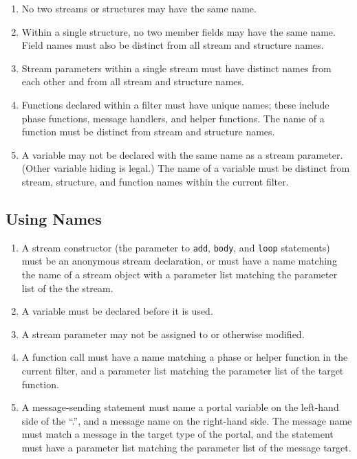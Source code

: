\documentclass[11pt]{article}
\begin{document}
\begin{enumerate}
\item No two streams or structures may have the same name.
\item Within a single structure, no two member fields may have the
  same name.  Field names must also be distinct from all stream and
  structure names.
\item Stream parameters within a single stream must have distinct
  names from each other and from all stream and structure names.
\item Functions declared within a filter must have unique names; these
  include phase functions, message handlers, and helper functions.
  The name of a function must be distinct from stream and structure
  names.
\item A variable may not be declared with the same name as a stream
  parameter.  (Other variable hiding is legal.)  The name of a
  variable must be distinct from stream, structure, and function
  names within the current filter.
\end{enumerate}

\subsection{Using Names}

\begin{enumerate}
\item A stream constructor (the parameter to \lstinline|add|,
  \lstinline|body|, and \lstinline|loop| statements) must be an
  anonymous stream declaration, or must have a name matching the name
  of a stream object with a parameter list matching the parameter list
  of  the the stream.
\item A variable must be declared before it is used.
\item A stream parameter may not be assigned to or otherwise modified.
\item A function call must have a name matching a phase or helper
  function in the current filter, and a parameter list matching the
  parameter list of the target function.
\item A message-sending statement must name a portal variable on the
  left-hand side of the ``.'', and a message name on the right-hand
  side.  The message name must match a message in the target type of
  the portal, and the statement must have a parameter list matching
  the parameter list of the message target.
\end{enumerate}
\end{document}

